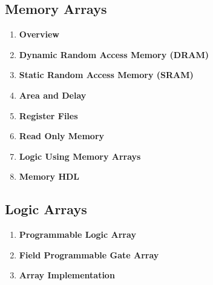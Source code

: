 \documentclass[12pt]{article}
\numberwithin{figure}{subsection}
\numberwithin{table}{subsection}
\numberwithin{equation}{subsection}
\begin{document}
\subsection{Memory Arrays}

\begin{enumerate}
  \item \textbf{Overview}

  \item \textbf{Dynamic Random Access Memory (DRAM)}

  \item \textbf{Static Random Access Memory (SRAM)}

  \item \textbf{Area and Delay}

  \item \textbf{Register Files}

  \item \textbf{Read Only Memory}

  \item \textbf{Logic Using Memory Arrays}

  \item \textbf{Memory HDL}
\end{enumerate}

\subsection{Logic Arrays}

\begin{enumerate}
  \item \textbf{Programmable Logic Array}

  \item \textbf{Field Programmable Gate Array}

  \item \textbf{Array Implementation}
\end{enumerate}
\end{document}
